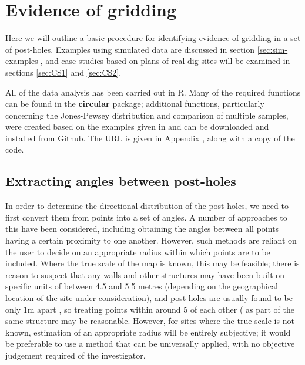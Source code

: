 \documentclass[../../ArchStats.tex]{subfiles}
\begin{document}


\section{Evidence of gridding}

Here we will outline a basic procedure for identifying  evidence of gridding in a set of post-holes. Examples using simulated data are discussed in section \ref{sec:sim-examples}, and case studies based on plans of real dig sites will be examined in sections \ref{sec:CS1} and \ref{sec:CS2}. 

All of the data analysis has been carried out in R. Many of the required functions can be found in the \textbf{circular} package; additional functions, particularly concerning the Jones-Pewsey distribution and comparison of multiple samples, were created based on the examples given in \cite{Pewsey2014} and can be downloaded and installed from Github. The URL is given in Appendix , along with a copy of the code.



\subsection{Extracting angles between post-holes}
In order to determine the directional distribution of the post-holes, we need to first convert them from points into a set of angles. A number of approaches to this have been considered, including obtaining the angles between all points having a certain proximity to one another. However, such methods are reliant on the user to decide on an appropriate radius within which points are to be included. Where the true scale of the map is known, this may be feasible; there is reason to suspect that any walls and other structures may have been built on specific units of between 4.5 and 5.5 metres (depending on the geographical location of the site under consideration), and post-holes are usually found to be only 1m apart , so treating points within around 5 of each other ( as part of the same structure may be reasonable. However, for sites where the true scale is not known, estimation of an appropriate radius will be entirely subjective; it would be preferable to use a method that can be universally applied, with no objective judgement required of the investigator.
\end{document}
